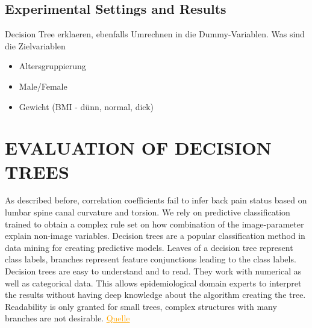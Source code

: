 \documentclass[a4paper,twoside]{style/article}
\newcommand{\com}[1]{\textcolor{orange}{\uline{#1}}}
\begin{document}
%

\subsection{Experimental Settings and Results}
Decision Tree erklaeren, ebenfalls Umrechnen in die Dummy-Variablen. Was sind die Zielvariablen
\begin{itemize}
\item Altersgruppierung
\item Male/Female
\item Gewicht (BMI - dünn, normal, dick)
\end{itemize}


\section{\uppercase{Evaluation of Decision Trees}}
\label{sec:DecisionTrees}
\noindent As described before, correlation coefficients fail to infer back pain status based on lumbar spine canal curvature and torsion.
We rely on predictive classification trained to obtain a complex rule set on how combination of the image-parameter explain non-image variables.
Decision trees are a popular classification method in data mining for creating predictive models.
Leaves of a decision tree represent class labels, branches represent feature conjunctions leading to the class labels.
Decision trees are easy to understand and to read.
They work with numerical as well as categorical data.
This allows epidemiological domain experts to interpret the results without having deep knowledge about the algorithm creating the tree.
Readability is only granted for small trees, complex structures with many branches are not desirable.
\com{Quelle}
\end{document}
